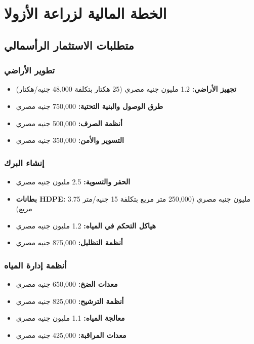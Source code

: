 \section{الخطة المالية لزراعة الأزولا}

\subsection{متطلبات الاستثمار الرأسمالي}

\subsubsection{تطوير الأراضي}
\begin{itemize}
    \item \textbf{تجهيز الأراضي:} 1.2 مليون جنيه مصري (25 هكتار بتكلفة 48,000 جنيه/هكتار)
    \item \textbf{طرق الوصول والبنية التحتية:} 750,000 جنيه مصري
    \item \textbf{أنظمة الصرف:} 500,000 جنيه مصري
    \item \textbf{التسوير والأمن:} 350,000 جنيه مصري
\end{itemize}

\subsubsection{إنشاء البرك}
\begin{itemize}
    \item \textbf{الحفر والتسوية:} 2.5 مليون جنيه مصري
    \item \textbf{بطانات HDPE:} 3.75 مليون جنيه مصري (250,000 متر مربع بتكلفة 15 جنيه/متر مربع)
    \item \textbf{هياكل التحكم في المياه:} 1.2 مليون جنيه مصري
    \item \textbf{أنظمة التظليل:} 875,000 جنيه مصري
\end{itemize}

\subsubsection{أنظمة إدارة المياه}
\begin{itemize}
    \item \textbf{معدات الضخ:} 650,000 جنيه مصري
    \item \textbf{أنظمة الترشيح:} 825,000 جنيه مصري
    \item \textbf{معالجة المياه:} 1.1 مليون جنيه مصري
    \item \textbf{معدات المراقبة:} 425,000 جنيه مصري
\end{itemize}

